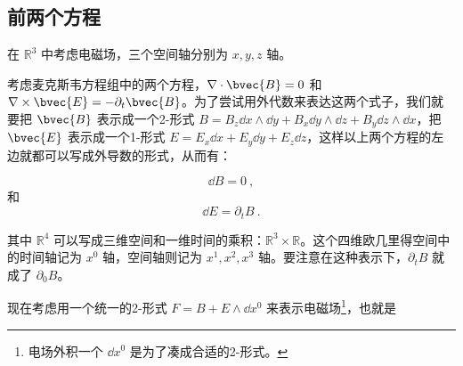 

\subsection{前两个方程}



在 $\mathbb{R}^3$ 中考虑电磁场，三个空间轴分别为 $x, y, z$ 轴。

考虑麦克斯韦方程组中的两个方程，$\nabla\cdot\bvec{B}=0$ 和 $\nabla\times\bvec{E}=-\partial_t\bvec{B}$。为了尝试用外代数来表达这两个式子，我们就要把 $\bvec{B}$
表示成一个2-形式 $B=B_z\dd x\wedge\dd y+B_x\dd y\wedge\dd z+B_y\dd z\wedge\dd x$，把 $\bvec{E}$ 表示成一个1-形式 $E=E_x\dd x+E_y\dd y+E_z\dd z$，这样以上两个方程的左边就都可以写成外导数的形式，从而有：

\begin{equation}\label{eq_MWEq2_3}
\dd B=0~,
\end{equation}
和
\begin{equation}\label{eq_MWEq2_4}
\dd E=\partial_tB~.
\end{equation}

其中 $\mathbb{R}^4$ 可以写成三维空间和一维时间的乘积：$\mathbb{R}^3\times\mathbb{R}$。这个四维欧几里得空间中的时间轴记为 $x^0$ 轴，空间轴则记为 $x^1, x^2, x^3$ 轴。要注意在这种表示下，$\partial_tB$ 就成了 $\partial_0B$。

现在考虑用一个统一的2-形式 $F=B+E\wedge\dd x^0$ 来表示电磁场\footnote{电场外积一个 $\dd x^0$ 是为了凑成合适的2-形式。}，也就是

